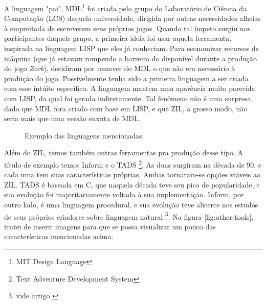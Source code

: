 A linguagem "pai", MDL\footnote{MIT Design Language} foi criada pelo grupo do
Laboratório de Ciência da Computação (LCS) daquela universidade, dirigida por
outras necessidades alheias à empreitada de escreverem seus próprios jogos. Quando
tal ímpeto surgiu nos participantes daquele grupo, a primeira ideia foi usar
aquela ferramenta, inspirada na linguagem LISP que eles já conheciam. Para
economizar recursos de máquina (que já estavam rompendo a barreira do disponível
durante a produção do jogo \emph{Zork}), decidiram por remover do MDL o que não
era necessário à produção do jogo. Possivelmente tenha sido a primeira linguagem
a ser criada com esse intúito específico. A linguagem mantem uma aparência muito
parecida com LISP, da qual foi gerada indiretamente. Tal fenômeno não é uma
surpresa, dado que MDL fora criado com base em LISP, e que ZIL, a grosso modo,
não seria mais que uma versão enxuta de MDL.

\begin{figure}
  \centering
  \caption{Exemplo das linguagens mencionadas}
  \label{fig:zil}
\end{figure}

Além do ZIL, temos também outras ferramentas pra produção desse tipo. A título
de exemplo temos Inform e o TADS \footnote{Text Adventure Development System}.
As duas surgiram na década de 90, e cada uma tem suas características próprias.
Ambas tornaram-se opções viáveis ao ZIL. TADS é baseada em C, que naquela década
teve seu pico de popularidade, e sua evolução foi majoritariamente voltada à sua
implementação. Inform, por outro lado, é uma linguagem procedural, e sua
evolução teve alicerce nos estudos de seus próprios criadores sobre linguagem
natural \footnote{vide artigo \citet{Nel:06}}. Na figura \ref{fig:other-tools},
tratei de inserir imagens para que se possa visualizar um pouco das
características mencionadas acima.

